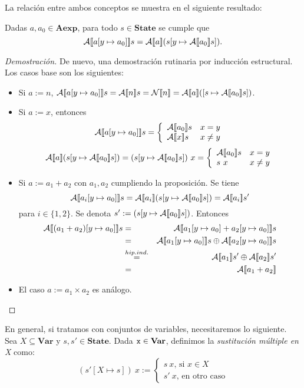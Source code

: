 La relación entre ambos conceptos se muestra en el siguiente resultado:
\begin{lema}
Dadas $a, a_0 \in \mathbf{Aexp}$, para todo $s \in \mathbf{State}$ se cumple que $$\mathcal{A}[\![a[y\mapsto a_0]]\!]s = \mathcal{A}[\![a]\!](s[y\mapsto \mathcal{A}[\![a_0]\!]s]).$$
\end{lema}
\begin{proof}[Demostración]
De nuevo, una demostración rutinaria por inducción estructural. Los casos base son los siguientes:
\begin{itemize}
    \item Si $a := n$, $\fc{A}{a[y\mapsto a_0]}s =  \fc{A}{n}s = \fc{N}{n} = \fc{A}{a}([s\mapsto \fc{A}{a_0}s])$.
    \item Si $a:= x$, entonces
    \[
        \mathcal{A}[\![a[y\mapsto a_0]]\!]s = \left\{\begin{array}{ll}
            \mathcal{A}[\![a_0]\!]s & x=y \\
            \mathcal{A}[\![x]\!]s & x\neq y
        \end{array}\right.
    \]
    $$
        \fc{A}{a}(s[y\mapsto \fc{A}{a_0}s]) = (s[y\mapsto \fc{A}{a_0}s])\ x = \left\{ \begin{array}{ll}
             \fc{A}{a_0}s & x=y \\
             s\ x & x\neq y
        \end{array}\right.
    $$
    \item Si $a := a_1 + a_2$ con $a_1,a_2$ cumpliendo la proposición. Se tiene 
    \[
        \fc{A}{a_i[y\mapsto a_0]}s = \fc{A}{a_i}(s[y\mapsto \fc{A}{a_0}s]) =
        \fc{A}{a_i}s' 
    \]
    para $i\in\{1, 2\}$. Se denota $s' := (s[y\mapsto \mathcal{A}[\![a_0]\!]s])$.
    Entonces
    \begin{eqnarray*}
        \fc{A}{(a_1+a_2)[y\mapsto a_0]}s &=&
        \fc{A}{a_1[y\mapsto a_0]+a_2[y\mapsto a_0]}s  \\
        &=& \fc{A}{a_1[y\mapsto a_0]}s\oplus\fc{A}{a_2[y\mapsto a_0]}s \\
        &\overset{hip.ind.}{=}& \fc{A}{a_1}s' \oplus\fc{A}{a_2}s' \\
        &=& \fc{A}{a_1+a_2}
    \end{eqnarray*}
    \item El caso $a := a_1 \times a_2$ es análogo.
\end{itemize}
\end{proof}

En general, si tratamos con conjuntos de variables, necesitaremos lo siguiente. Sea $X\subseteq \mathbf{Var}$ y $s, s' \in \mathbf{State}$. Dada $\texttt{x}\in \mathbf{Var}$, definimos la \textit{sustitución múltiple en X} como:
$$(s'[X\mapsto s])\ x := \begin{cases} s\ x\text{, si } x\in X \\ s'\ x \text{, en otro caso}\end{cases}$$






